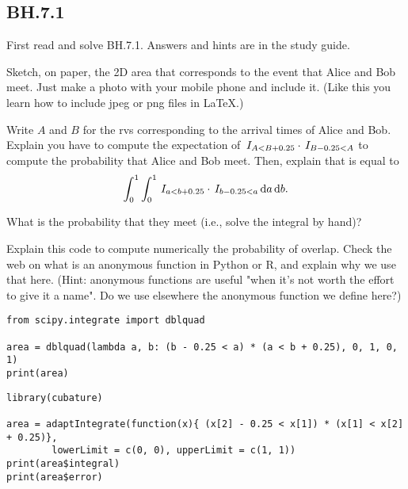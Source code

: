 \subsection{BH.7.1}
\label{sec:bh.7.1}

First read and solve BH.7.1. Answers and hints are in the study guide.


\begin{exercise}\label{ex:ab}
Sketch, on paper, the 2D area that corresponds to the event that Alice and Bob meet. Just make a photo with your mobile phone and include it. (Like this you learn how to include jpeg or png files in \LaTeX.)
\end{exercise}

\begin{exercise}
Write $A$ and $B$ for the rvs corresponding to the arrival times of Alice and Bob.
Explain  you have to compute the expectation of  $\,I_{A<B+0.25}\cdot\,I_{B-0.25 < A}$
to compute the probability that Alice and Bob meet.
Then,  explain that is equal to
\begin{equation}
\int_0^1\int_0^1 \,I_{a<b+0.25}\cdot \,I_{b-0.25 < a} \,\textrm{d}a \,\textrm{d}b.
\end{equation}
\end{exercise}

\begin{exercise}
What is the probability that they meet (i.e., solve the integral by hand)?
\end{exercise}

\begin{exercise}
Explain this code to compute numerically the probability of overlap. Check the web on what is an anonymous function in Python or R, and explain why we use that here.
(Hint: anonymous functions are useful "when it’s not worth the effort to give it a name". Do we use elsewhere the anonymous function we define here?)
\begin{verbatim}
from scipy.integrate import dblquad

area = dblquad(lambda a, b: (b - 0.25 < a) * (a < b + 0.25), 0, 1, 0, 1)
print(area)
\end{verbatim}

\begin{verbatim}
library(cubature)   

area = adaptIntegrate(function(x){ (x[2] - 0.25 < x[1]) * (x[1] < x[2] + 0.25)}, 
		lowerLimit = c(0, 0), upperLimit = c(1, 1))
print(area$integral)
print(area$error)
\end{verbatim}
\end{exercise}

